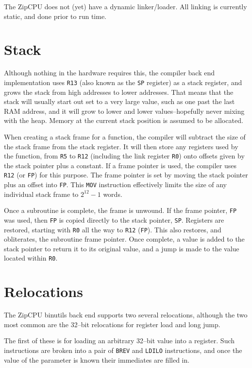 \documentclass{gqtekspec}
\begin{document}
The ZipCPU does not (yet) have a dynamic linker/loader.  All linking is
currently static, and done prior to run time.

\section{Stack}\label{sec:abi-stack}
Although nothing in the hardware requires this, the compiler back end
implementation uses {\tt R13} (also known as the {\tt SP} register) as a stack
register, and grows the stack from
high addresses to lower addresses.  That means that the stack will usually
start out set to a very large value, such as one past the last RAM address,
and it will grow to lower and lower values--hopefully never mixing with the
heap.  Memory at the current stack position is assumed to be allocated.

When creating a stack frame for a function, the compiler will subtract
the size of the stack frame from the stack register.  It will then store
any registers used by the function, from {\tt R5} to {\tt R12} (including
the link register {\tt R0}) onto offsets given by the stack pointer plus a 
constant.  If a frame pointer is used, the compiler uses {\tt R12} (or {\tt FP})
for this purpose.  The frame pointer is set by moving the stack pointer
plus an offset into {\tt FP}.  This {\tt MOV} instruction effectively limits
the size of any individual stack frame to $2^{12}-1$ words.

Once a subroutine is complete, the frame is unwound.  If the frame pointer,
{\tt FP} was used, then {\tt FP} is copied directly to the stack pointer,
{\tt SP}.  Registers are restored, starting with {\tt R0} all the way to
{\tt R12} ({\tt FP}).  This also restores, and obliterates, the subroutine
frame pointer.  Once complete, a value is added to the stack pointer to return
it to its original value, and a jump is made to the value located within
{\tt R0}.

\section{Relocations}\label{sec:abi-reloc}

The ZipCPU binutils back end supports two several relocations, although the
two most common are the 32--bit relocations for register load and long jump.

The first of these is for loading an arbitrary 32--bit value into a register. 
Such instructions are broken into a pair of {\tt BREV} and {\tt LDILO}
instructions, and once the value of the parameter is known their immediates
are filled in.
\end{document}
